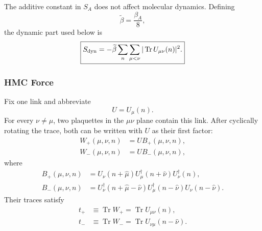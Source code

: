 The additive constant in $S_A$ does not affect molecular dynamics.  Defining
\begin{equation}
\widetilde\beta=\frac{\beta_A}{8},
\end{equation}
the dynamic part used below is
\begin{equation}
\boxed{
S_{\rm dyn}=-\widetilde\beta\sum_n\sum_{\mu<\nu}
|\operatorname{Tr}U_{\mu\nu}(n)|^2 .
}
\end{equation}

\subsubsection{HMC Force}

Fix one link and abbreviate
\begin{equation}
U=U_\mu(n).
\end{equation}
For every $\nu\ne\mu$, two plaquettes in the $\mu\nu$ plane contain this
link.  After cyclically rotating the trace, both can be written with $U$ as
their first factor:
\begin{align}
W_{+}(\mu,\nu,n)&=U B_{+}(\mu,\nu,n),\\
W_{-}(\mu,\nu,n)&=U B_{-}(\mu,\nu,n),
\end{align}
where
\begin{align}
B_{+}(\mu,\nu,n)
&=U_\nu(n+\hat\mu)U_\mu^\dagger(n+\hat\nu)U_\nu^\dagger(n),\\
B_{-}(\mu,\nu,n)
&=U_\nu^\dagger(n+\hat\mu-\hat\nu)
  U_\mu^\dagger(n-\hat\nu)U_\nu(n-\hat\nu).
\end{align}
Their traces satisfy
\begin{align}
t_{+}&\equiv\operatorname{Tr}W_{+}
      =\operatorname{Tr}U_{\mu\nu}(n),\\
t_{-}&\equiv\operatorname{Tr}W_{-}
      =\operatorname{Tr}U_{\nu\mu}(n-\hat\nu).
\end{align}

